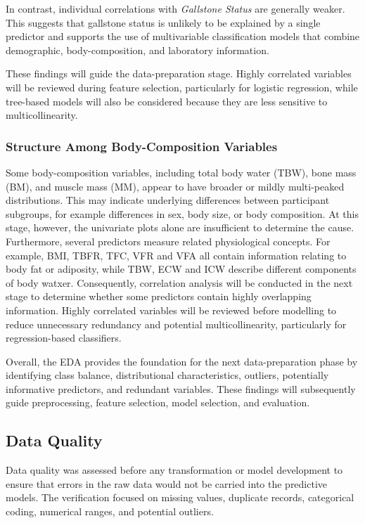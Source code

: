 In contrast, individual correlations with \textit{Gallstone Status} are generally weaker. This suggests that gallstone status is unlikely to be explained by a single predictor and supports the use of multivariable classification models that combine demographic, body-composition, and
laboratory information.

These findings will guide the data-preparation stage. Highly correlated variables will be reviewed during feature selection, particularly for logistic regression, while tree-based models will also be considered because they are less sensitive to multicollinearity.


\subsubsection{Structure Among Body-Composition Variables}

Some body-composition variables, including total body water (TBW), bone mass (BM), and muscle mass (MM), appear to have broader or mildly multi-peaked distributions. This may indicate underlying differences between participant subgroups, for example differences in sex, body size, or body composition. At this stage, however, the univariate plots alone are insufficient to determine the cause. Furthermore, several predictors measure related physiological concepts. For example, BMI, TBFR, TFC, VFR and VFA all contain information relating to body fat or adiposity, while TBW, ECW and ICW describe different components of body watxer. Consequently, correlation analysis will be conducted in the next stage to determine whether some predictors contain highly overlapping information. Highly correlated variables will be reviewed before modelling to reduce unnecessary redundancy and potential multicollinearity, particularly for regression-based classifiers.


Overall, the EDA provides the foundation for the next data-preparation phase by identifying class balance, distributional characteristics, outliers, potentially informative predictors, and redundant variables. These findings will subsequently guide preprocessing, feature selection, model selection, and evaluation.

\subsection{Data Quality}
Data quality was assessed before any transformation or model development to ensure that errors in the raw data would not be carried into the predictive models. The verification focused on missing values, duplicate records, categorical coding, numerical ranges, and potential outliers.

